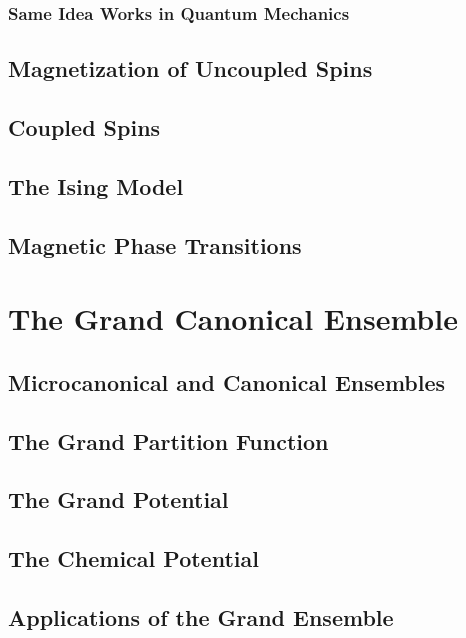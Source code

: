 \documentclass[11pt,a4paper]{article}
\theoremstyle{theorem}
\theoremstyle{definition}
\theoremstyle{definition}
\theoremstyle{remark}
\theoremstyle{definition}
\theoremstyle{remark}
\begin{document}
\subsubsection{Same Idea Works in Quantum Mechanics}

\subsection{Magnetization of Uncoupled Spins}

\subsection{Coupled Spins}

\subsection{The Ising Model}

\subsection{Magnetic Phase Transitions}

\section{The Grand Canonical Ensemble}

\subsection{Microcanonical and Canonical Ensembles}

\subsection{The Grand Partition Function}

\subsection{The Grand Potential}

\subsection{The Chemical Potential}

\subsection{Applications of the Grand Ensemble}
\end{document}
